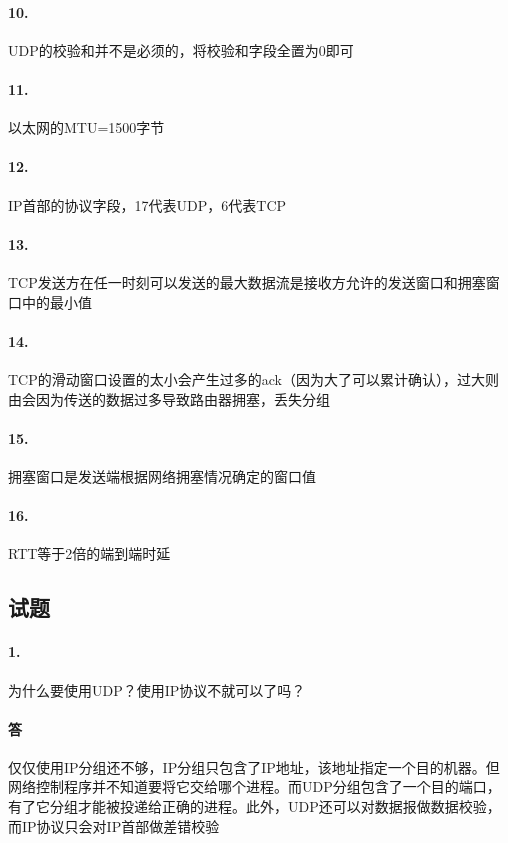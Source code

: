 \documentclass[UTF8]{ctexart} %
\begin{document}
\paragraph{10.} UDP的校验和并不是必须的，将校验和字段全置为0即可

\paragraph{11.} 以太网的MTU=1500字节

\paragraph{12.} IP首部的协议字段，17代表UDP，6代表TCP

\paragraph{13.} TCP发送⽅在任⼀时刻可以发送的最⼤数据流是接收⽅允许的发送窗⼝和拥塞窗⼝中的最⼩值

\paragraph{14.} TCP的滑动窗口设置的太小会产生过多的ack（因为大了可以累计确认），过大则由会因为传送的数据过多导致路由器拥塞，丢失分组

\paragraph{15.} 拥塞窗口是发送端根据网络拥塞情况确定的窗口值

\paragraph{16.} RTT等于2倍的端到端时延

\subsection{试题}

\paragraph{1.} 为什么要使用UDP？使用IP协议不就可以了吗？

\paragraph{答} 仅仅使用IP分组还不够，IP分组只包含了IP地址，该地址指定一个目的机器。但网络控制程序并不知道要将它交给哪个进程。而UDP分组包含了一个目的端口，有了它分组才能被投递给正确的进程。此外，UDP还可以对数据报做数据校验，而IP协议只会对IP首部做差错校验
\end{document}

